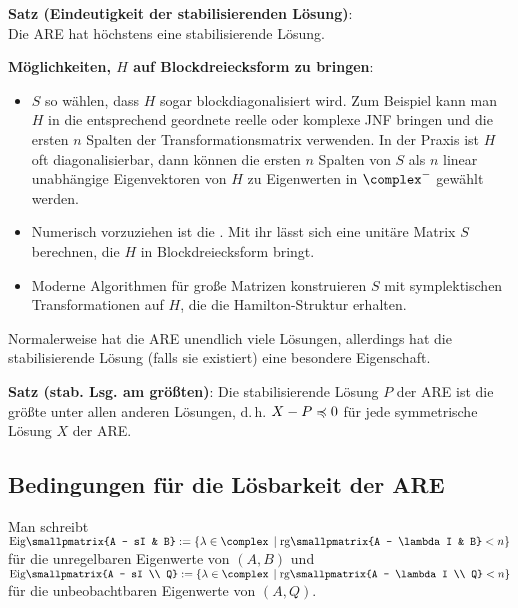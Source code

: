 \textbf{Satz (Eindeutigkeit der stabilisierenden Lösung)}:\\
Die ARE hat höchstens eine stabilisierende Lösung.

\linie

\textbf{Möglichkeiten, $H$ auf Blockdreiecksform zu bringen}:
\begin{itemize}
    \item
    $S$ so wählen, dass $H$ sogar blockdiagonalisiert wird.
    Zum Beispiel kann man $H$ in die entsprechend geordnete reelle oder komplexe JNF bringen
    und die ersten $n$ Spalten der Transformationsmatrix verwenden.
    In der Praxis ist $H$ oft diagonalisierbar,
    dann können die ersten $n$
    Spalten von $S$ als $n$ linear unabhängige Eigenvektoren von $H$
    zu Eigenwerten in $\complex^-$ gewählt werden.

    \item
    Numerisch vorzuziehen ist die .
    Mit ihr lässt sich eine unitäre Matrix $S$ berechnen, die $H$ in Blockdreiecksform bringt.

    \item
    Moderne Algorithmen für große Matrizen konstruieren $S$ mit symplektischen Transformationen
    auf $H$, die die Hamilton-Struktur erhalten.
\end{itemize}

\linie

Normalerweise hat die ARE unendlich viele Lösungen, allerdings hat die stabilisierende Lösung
(falls sie existiert) eine besondere Eigenschaft.

\textbf{Satz (stab. Lsg. am größten)}:
Die stabilisierende Lösung $P$ der ARE ist die größte unter allen anderen Lösungen,
d.\,h. $X - P \preccurlyeq 0$ für jede symmetrische Lösung $X$ der ARE.

\pagebreak

\subsection{%
    Bedingungen für die Lösbarkeit der ARE%
}

Man schreibt $\Eig\!\smallpmatrix{A - sI & B} := \{\lambda \in \complex \;\left|\;
\rg\!\smallpmatrix{A - \lambda I & B} < n\right\}$ für die
unregelbaren Eigenwerte von $(A, B)$ und
$\Eig\!\smallpmatrix{A - sI \\ Q} := \{\lambda \in \complex \;\left|\;
\rg\!\smallpmatrix{A - \lambda I \\ Q} < n\right\}$ für die
unbeobachtbaren Eigenwerte von $(A, Q)$.

